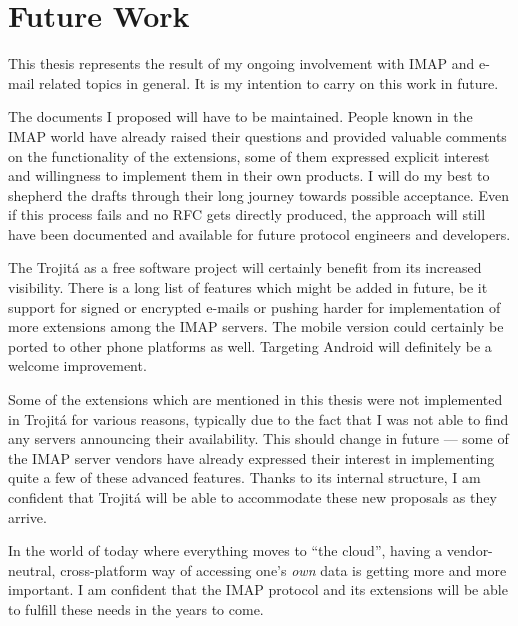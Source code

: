 \documentclass[trojita]{subfiles}
\begin{document}
\section{Future Work}
\label{sec:future-work}

This thesis represents the result of my ongoing involvement with IMAP and e-mail related topics in general.  It is my
intention to carry on this work in future.

The documents I proposed will have to be maintained.  People known in the IMAP world have already raised their questions
and provided valuable comments on the functionality of the extensions, some of them expressed explicit interest and
willingness to implement them in their own products.  I will do my best to shepherd the drafts through their long
journey towards possible acceptance.  Even if this process fails and no RFC gets directly produced, the approach will
still have been documented and available for future protocol engineers and developers.

The Trojitá as a free software project will certainly benefit from its increased visibility.  There is a long list of
features which might be added in future, be it support for signed or encrypted e-mails or pushing harder for
implementation of more extensions among the IMAP servers.  The mobile version could certainly be ported to other phone
platforms as well.  Targeting Android will definitely be a welcome improvement.

Some of the extensions which are mentioned in this thesis were not implemented in Trojitá for various reasons, typically
due to the fact that I was not able to find any servers announcing their availability.  This should change in future ---
some of the IMAP server vendors have already expressed their interest in implementing quite a few of these advanced
features.  Thanks to its internal structure, I am confident that Trojitá will be able to accommodate these new proposals
as they arrive.

\enlargethispage{\baselineskip}
In the world of today where everything moves to ``the cloud'', having a vendor-neutral, cross-platform way of accessing
one's {\em own} data is getting more and more important.  I am confident that the IMAP protocol and its extensions will
be able to fulfill these needs in the years to come.
\end{document}
